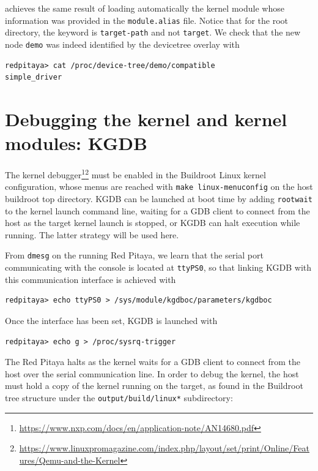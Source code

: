 \documentclass{article}
\begin{document}
{{{\noindent achieves the same result of loading automatically the kernel module whose information
was provided in the {\tt module.alias} file. Notice that for the root directory, the keyword
is {\tt target-path} and not {\tt target}. We check that the new node {\tt demo} was indeed 
identified by the devicetree overlay with

{\footnotesize
\begin{verbatim}
redpitaya> cat /proc/device-tree/demo/compatible 
simple_driver
\end{verbatim}
}

\section{Debugging the kernel and kernel modules: KGDB}

The kernel debugger\footnote{\url{https://www.nxp.com/docs/en/application-note/AN14680.pdf}}\footnote{\url{https://www.linuxpromagazine.com/index.php/layout/set/print/Online/Features/Qemu-and-the-Kernel}}
must be enabled in the Buildroot Linux kernel configuration, whose menus are
reached with {\tt make linux-menuconfig} on the host buildroot top directory. KGDB can be launched
at boot time by adding {\tt rootwait} to the kernel launch command line, waiting for a GDB client 
to connect from the host as the target kernel launch is stopped, or KGDB can halt execution while 
running. The latter strategy will be used here. 

From {\tt dmesg} on the running Red Pitaya, we learn that the serial port communicating with the
console is located at {\tt ttyPS0}, so that linking KGDB with this communication interface is 
achieved with 

\noindent
\begin{verbatim}
redpitaya> echo ttyPS0 > /sys/module/kgdboc/parameters/kgdboc 
\end{verbatim}

Once the interface has been set, KGDB is launched with

\noindent
\begin{verbatim}
redpitaya> echo g > /proc/sysrq-trigger 
\end{verbatim}

The Red Pitaya halts as the kernel waits for a GDB client to connect from the host over the serial 
communication line. In order to debug the kernel, the host must hold a copy of the kernel running
on the target, as found in the Buildroot tree structure under the {\tt output/build/linux*} subdirectory:

}}}
\end{document}
